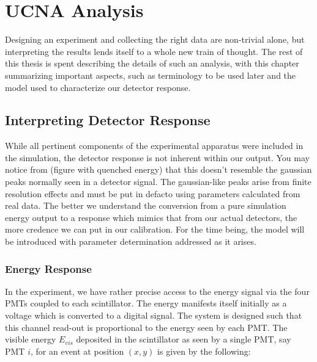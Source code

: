 \chapter{UCNA Analysis}
\label{ch:UCNA_Analysis}

Designing an experiment and collecting the right data are non-trivial alone,
but interpreting the results lends itself to a whole new train of thought.
The rest of this thesis is spent describing the details of such an
analysis, with this chapter summarizing important aspects,
such as terminology to be used later and the
model used to characterize our detector response.



\section{Interpreting Detector Response}
While all pertinent components of the experimental apparatus were included
in the simulation, the detector response is not inherent within our
output. You may notice from (figure with quenched energy) that this
doesn't resemble the gaussian peaks normally seen in a detector signal.
The gaussian-like peaks arise from finite resolution effects and
must be put in defacto using parameters calculated
from real data. The better we understand the conversion from a pure simulation
energy output to a response which mimics that from our actual detectors, the
more credence we can put in our calibration. For the time being, the model
will be introduced with parameter determination addressed as it arises. 

\subsection{Energy Response} \label{sssec:EnergyResponse}
In the experiment, we have rather precise access to the energy signal via the
four PMTs coupled to each scintillator. The energy manifests itself initially as a voltage
which is converted to a digital signal. The system is designed such that this channel
read-out is proportional to the energy seen by each PMT. The visible energy $E_{vis}$ deposited
in the scintillator as seen by a single PMT, say PMT $i$, for an event at position $(x,y)$ 
is given by the following: 

